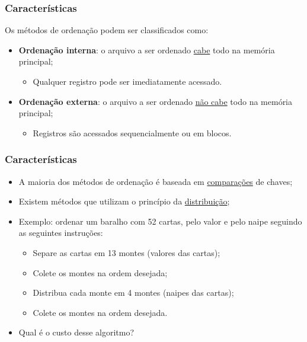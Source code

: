 \documentclass[aspectratio=169]{beamer}
\begin{document}

\begin{frame}
\frametitle{Características}
Os métodos de ordenação podem ser classificados como:
  \begin{itemize}
   \item {\bf Ordenação interna}: o arquivo a ser ordenado \underline{cabe} todo na memória principal;
   \begin{itemize}   
      \item Qualquer registro pode ser imediatamente acessado.
   \end{itemize}
  \end{itemize}
  \begin{itemize}
    \item {\bf Ordenação externa}: o arquivo a ser ordenado \underline{não cabe} todo na memória principal;
    \begin{itemize}
      \item Registros são acessados sequencialmente ou em blocos.
    \end{itemize}
  \end{itemize}
\end{frame}


\begin{frame}
\frametitle{Características}
  \begin{itemize}
   \item A maioria dos métodos de ordenação é baseada em \underline{comparações} de chaves;
   \item Existem métodos que utilizam o princípio da \underline{distribuição};
   \item Exemplo: ordenar um baralho com 52 cartas, pelo valor e pelo naipe seguindo as seguintes instruções:
   \begin{itemize}
    \item Separe as cartas em 13 montes (valores das cartas);
    \item Colete os montes na ordem desejada;
    \item Distribua cada monte em 4 montes (naipes das cartas);
    \item Colete os montes na ordem desejada.
   \end{itemize}
  \item Qual é o custo desse algoritmo?
  \end{itemize}
\end{frame}
\end{document}
